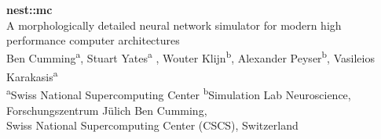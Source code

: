 \documentclass[a0paper,portrait]{baposter}
\newcommand{\nestmc}{{\textcolor{blue!30!black}{nest::mc}}\xspace}
\newcommand{\julich}{J\"ulich\xspace}
\begin{document}
\begin{poster}
{
  \vspace{0.3\headerheight}
}
{ \Huge
  \textbf{\nestmc} \\[0.1\baselineskip]
\large 
  A morphologically detailed neural network simulator for modern high performance computer architectures \\[0.2\baselineskip]
  \small
    Ben Cumming\textsuperscript{a}, Stuart Yates\textsuperscript{a} , Wouter Klijn\textsuperscript{b}, Alexander Peyser\textsuperscript{b}, Vasileios Karakasis\textsuperscript{a}\\
    \textsuperscript{a}Swiss National Supercomputing Center \hspace{2mm}\textsuperscript{b}Simulation Lab Neuroscience, Forschungszentrum \julich  %
}
{\small
    \vspace{1em} Ben Cumming, \\[0.5em]
    Swiss National Supercomputing Center (CSCS), Switzerland\\
}



\end{poster}
\end{document}
